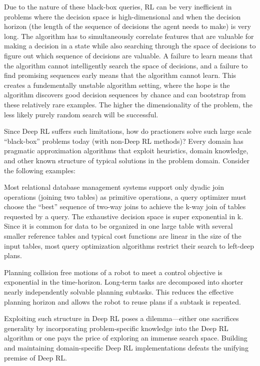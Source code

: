 Due to the nature of these black-box queries, RL can be very inefficient in problems where the decision space is high-dimensional and when the decision horizon (the length of the sequence of decisions the agent needs to make) is very long. 
The algorithm has to simultaneously correlate features that are valuable for making a decision in a state while also searching through the space of decisions to figure out which sequence of decisions are valuable. A failure to learn means that the algorithm cannot intelligently search the space of decisions, and a failure to find promising sequences early means that the algorithm cannot learn.
This creates a fundementally unstable algorithm setting, where the hope is the algorithm discovers good decision sequences by chance and can bootstrap from these relatively rare examples.
The higher the dimensionality of the problem, the less likely purely random search will be successful. 

Since Deep RL suffers such limitations, how do practioners solve such large scale ``black-box'' problems today (with non-Deep RL methods)? Every domain has pragmatic approximation algorithms that exploit heuristics, domain knowledge, and other known structure of typical solutions in the problem domain. Consider the following examples:

\begin{example}
Most relational database management systems support only dyadic join operations (joining two tables) as primitive operations, a query optimizer must choose the ``best'' sequence of two-way joins to achieve the k-way join of tables requested by a query. The exhaustive decision space is super exponential in k. Since it is common for data to be organized in one large table with several smaller reference tables and typical cost functions are linear in the size of the input tables, most query optimization algorithms restrict their search to left-deep plans.
\end{example}

\begin{example}
Planning collision free motions of a robot to meet a control objective is exponential in the time-horizon. Long-term tasks are decomposed into shorter nearly independently solvable planning subtasks. This reduces the effective planning horizon and allows the robot to reuse plans if a subtask is repeated.
\end{example}

Exploiting such structure in Deep RL poses a dilemma---either one sacrifices generality by incorporating problem-specific knowledge into the Deep RL algorithm or one pays the price of exploring an immense search space. Building and maintaining domain-specific Deep RL implementations defeats the unifying premise of Deep RL.

